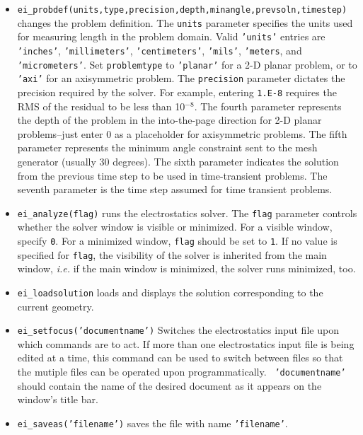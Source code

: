 \begin{itemize}
\item {\tt ei\_probdef(units,type,precision,depth,minangle,prevsoln,timestep)} changes the problem
definition. The \texttt{units} parameter specifies the units used
for measuring length in the problem domain. Valid \texttt{'units'}
entries are
\texttt{'inches'}, \texttt{'millimeters'}, \texttt{'centimeters'},
\texttt{'mils'}, \texttt{'meters}, and \texttt{'micrometers'}. Set
\texttt{problemtype} to \texttt{'planar'} for a 2-D planar problem, or to
\texttt{'axi'} for an axisymmetric problem. The \texttt{precision} parameter
dictates the precision required by the solver. For example, entering
\texttt{1.E-8} requires the RMS of the residual to be less than 10$^{ - 8}$.
The fourth parameter represents the depth of the problem in the
into-the-page direction for 2-D planar problems--just enter 0 as a placeholder for axisymmetric problems.
The fifth parameter represents the minimum angle constraint sent to the mesh generator (usually 30 degrees).
The sixth parameter indicates the solution from the previous time step
to be used in time-transient problems. The seventh parameter is the time step assumed
for time transient problems.

\item {\tt ei\_analyze(flag)} runs the electrostatics solver.
The {\tt flag} parameter
controls whether the solver window is visible or minimized.  For a
visible window,  specify {\tt 0}. For a minimized window, {\tt flag} should be set to {\tt 1}.
If no value is specified for {\tt flag}, the visibility of the solver is inherited from the main window,
{\em i.e.} if the main window is minimized, the solver runs minimized, too.

\item {\tt ei\_loadsolution} loads and displays the solution corresponding to the
current geometry.

\item {\tt ei\_setfocus('documentname')} Switches the
electrostatics input file upon which commands are to act. If
more than one electrostatics input file is being edited at a time,
this command can be used to switch between files so that the
mutiple files can be operated upon programmatically. {\tt
'documentname'} should contain the name of the desired document as
it appears on the window's title bar.

\item {\tt ei\_saveas('filename')} saves the file with name
\texttt{'filename'}.

\end{itemize}

